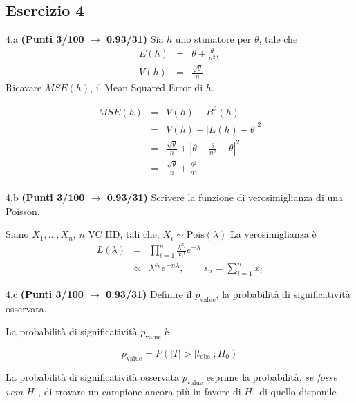 \documentclass[
  11pt,
]{book}
\theoremstyle{mytheoremstyle}
\theoremstyle{mydefstyle}
\newenvironment{sol}
  {
  \begin{tcolorbox}[enhanced,breakable,arc=0.1mm,boxrule=1pt,colback=white,colframe=iblue,
  title=\bf \fontfamily{lmss}\selectfont \hspace{.5 cm} Soluzione,drop fuzzy shadow]

}{
\end{tcolorbox}
  }
\begin{document}
\subsection{Esercizio 4}\label{esercizio-4-5}

4.a \textbf{(Punti 3/100 \(\rightarrow\) 0.93/31)} Sia \(h\) uno stimatore per \(\theta\), tale che
\begin{eqnarray*}
E(h)&=&\theta+\frac\theta {n^2},\\
V(h)&=&\frac{\sqrt\theta}{ n}.
\end{eqnarray*}
Ricavare \(MSE(h)\), il Mean Squared Error di \(h\).

\begin{sol}
\begin{eqnarray*}
MSE(h)&=&V(h)+B^2(h)\\
&=&V(h)+|E(h)-\theta|^2\\
&=&\frac{\sqrt\theta}{ n}+\left|\theta+\frac\theta {n^2}-\theta\right|^2\\
&=&\frac{\sqrt\theta}{ n}+\frac{\theta^2} { n^4}\\
\end{eqnarray*}

\end{sol}

4.b \textbf{(Punti 3/100 \(\rightarrow\) 0.93/31)} Scrivere la funzione di verosimiglianza di una Poisson.

\begin{sol}
Siano \(X_1,...,X_n\), \(n\) VC IID, tali che, \(X_i\sim\text{Pois}(\lambda)\)
La verosimiglianza è
\begin{eqnarray*}
  L(\lambda) &=& \prod_{i=1}^n\frac{\lambda^{x_i}}{x_i!}e^{-\lambda}\\
             &\propto& \lambda^{s_n} e^{-n\lambda},\qquad s_n=\sum_{i=1}^n x_i
\end{eqnarray*}

\end{sol}

4.c \textbf{(Punti 3/100 \(\rightarrow\) 0.93/31)} Definire il \(p_{\text{value}}\), la probabilità di significatività osservata.

\begin{sol}
La probabilità di significatività \(p_{\text{value}}\) è

\[p_{\text{value}}=P(|T|>|t_{\text{obs}}|;H_0)\]

La probabilità di significatività osservata \(p_\text{value}\) esprime la probabilità, \emph{se fosse vera} \(H_0\),
di trovare un campione ancora più in favore di \(H_1\) di quello disponile

\end{sol}
\end{document}
